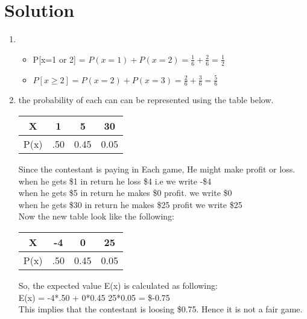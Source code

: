 \documentclass[a4paper,11pt]{article}
\begin{document}
\section{Solution}
\begin{enumerate}
    \item \begin{itemize}
    \item P[x=1 or 2] = $P(x=1)+P(x=2) = \frac{1}{6}+\frac{2}{6} = \frac{1}{2}$
    \item $P[x\geq2] = P(x=2)+P(x=3) = \frac{2}{6}+\frac{3}{6} = \frac{5}{6}$
\end{itemize}

    \item the probability of each can  can be represented using the table below.\\
    
\begin{tabular}{|c|c|c|c|}
\hline
X & 1 & 5 & 30\\
\hline
P(x)&.50 & 0.45 & 0.05\\
\hline
\end{tabular}

Since the contestant is paying in Each game, He might make profit or loss.\\
when he gets \$1 in return he loss \$4 i.e we write -\$4 \\
when he gets \$5 in return he makes \$0 profit. we write \$0\\
when he gets \$30 in return he makes \$25 profit we write \$25\\

Now the new table look like the following:\\
\begin{tabular}{|c|c|c|c|}
\hline
X & -4 & 0 & 25\\
\hline
P(x)&.50 & 0.45 & 0.05\\
\hline
\end{tabular}

So, the expected value E(x) is calculated as following:\\
E(x) = -4*.50 + 0*0.45  25*0.05 = \$-0.75\\
This implies that the contestant is loosing \$0.75. Hence it is not a fair game.


\end{enumerate}
\end{document}

